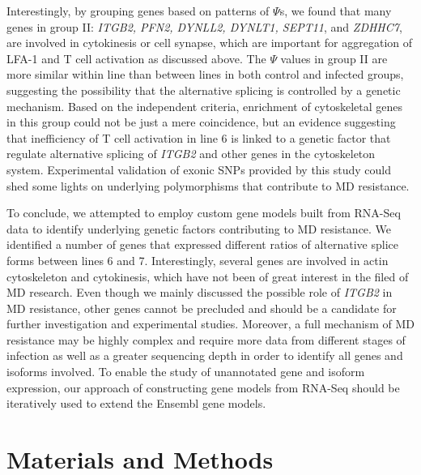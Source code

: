 \documentclass[10pt]{article}
\begin{document}
Interestingly, by grouping genes based on patterns of $\Psi$s, we found that many genes in group
II: \textit{ITGB2, PFN2, DYNLL2, DYNLT1, SEPT11}, and \textit{ZDHHC7}, are involved in cytokinesis or
cell synapse, which are important for aggregation of LFA-1 and T cell activation as discussed above.
The $\Psi$ values in group II are more similar within line than between lines in both control and
infected groups, suggesting the possibility that the alternative splicing is
controlled by a genetic mechanism.
Based on the independent criteria, enrichment of cytoskeletal genes in this group could not be
just a mere coincidence, but an evidence suggesting that inefficiency of T cell activation
in line 6 is linked to a genetic factor that regulate alternative splicing of \textit{ITGB2}
and other genes in the cytoskeleton system.
Experimental validation of exonic SNPs provided by this study could shed some lights on
underlying polymorphisms that contribute to MD resistance.

To conclude, we attempted to employ custom gene models built from RNA-Seq data to
identify underlying genetic factors contributing to MD resistance.
We identified a number of genes that expressed different ratios of alternative splice forms
between lines 6 and 7.
Interestingly, several genes are involved in actin cytoskeleton and cytokinesis, which have
not been of great interest in the filed of MD research.
Even though we mainly discussed the possible role of \textit{ITGB2} in MD resistance, other
genes cannot be precluded and should be a candidate for further investigation and experimental studies.
Moreover, a full mechanism of MD resistance may be highly complex and require more data from different
stages of infection as well as a greater sequencing depth in order to identify all
genes and isoforms involved.
To enable the study of unannotated gene and isoform expression,
our approach of constructing gene models from RNA-Seq should be iteratively used to extend
the Ensembl gene models.


\section*{Materials and Methods}
\end{document}
